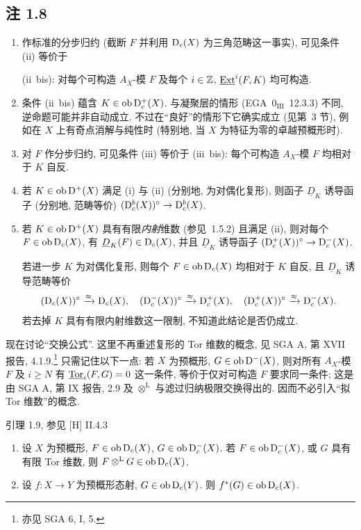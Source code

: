 \subsection*{注 1.8}
\begin{enumerate}[label=\alph*)]
\item 作标准的分步归约 (截断 $F$ 并利用 $\mathrm{D}_c(X)$ 为三角范畴这一事实), 可见条件 (ii) 等价于

(ii~bis): 对每个可构造 $A_X$-模 $F$ 及每个 $i \in \mathbb Z$, $\underline{\operatorname{Ext}}^i(F,K)$ 均可构造.

\item 条件 (ii~bis) 蕴含 $K \in \operatorname{ob} \mathrm{D}_c^{+}(X)$. 与凝聚层的情形 (EGA~$0_{\mathrm{III}}$~12.3.3) 不同, 逆命题可能并非自动成立. 不过在“良好”的情形下它确实成立 (见第~3 节), 例如在 $X$ 上有奇点消解与纯性时 (特别地, 当 $X$ 为特征为零的卓越预概形时).

\item 对 $F$ 作分步归约, 可见条件 (iii) 等价于 (iii~bis): 每个可构造 $A_X$-模 $F$ 均相对于 $K$ 自反.

\item 若 $K \in \operatorname{ob} \mathrm{D}^{+}(X)$ 满足 (i) 与 (ii) (分别地, 为对偶化复形), 则函子 $\underline{D}_K$ 诱导函子 (分别地, 范畴等价) $(\mathrm{D}_c^{b}(X))^{\circ} \to \mathrm{D}_c^{b}(X)$.

\item 若 $K \in \operatorname{ob} \mathrm{D}^{+}(X)$ 具有有限\emph{内射}维数 (参见~1.5.2) 且满足 (ii), 则对每个 $F \in \operatorname{ob} \mathrm{D}_c(X)$, 有 $\underline{D}_K(F) \in \mathrm{D}_c(X)$, 并且 $\underline{D}_K$ 诱导函子 $(\mathrm{D}_c^{+}(X))^{\circ} \to \mathrm{D}_c^{-}(X)$.

若进一步 $K$ 为对偶化复形, 则每个 $F \in \operatorname{ob} \mathrm{D}_c(X)$ 均相对于 $K$ 自反, 且 $\underline{D}_K$ 诱导范畴等价
\[
(\mathrm{D}_c(X))^{\circ} \xrightarrow{\approx} \mathrm{D}_c(X), \quad (\mathrm{D}_c^{-}(X))^{\circ} \xrightarrow{\approx} \mathrm{D}_c^{+}(X), \quad (\mathrm{D}_c^{+}(X))^{\circ} \xrightarrow{\approx} \mathrm{D}_c^{-}(X).
\]
若去掉 $K$ 具有有限内射维数这一限制, 不知道此结论是否仍成立.
\end{enumerate}

现在讨论“交换公式”. 这里不再重述复形的 Tor 维数的概念, 见 SGA A, 第 XVII 报告, 4.1.9.\footnote{亦见 SGA 6, I, 5.} 只需记住以下一点: 若 $X$ 为预概形, $G\in\operatorname{ob}\mathrm{D}^-(X)$, 则对所有 $A_X$-模 $F$ 及 $i\geqslant N$ 有 $\underline{\operatorname{Tor}}_i(F,G)=0$ 这一条件, 等价于仅对可构造 $F$ 要求同一条件; 这是由 SGA A, 第 IX 报告, 2.9 及 $\otimes^{\mathrm L}$ 与滤过归纳极限交换得出的. 因而不必引入“拟 Tor 维数”的概念.

\begin{statement}{引理 1.9, 参见 [H] II.4.3}
\begin{enumerate}[label=\alph*)]
\item 设 $X$ 为预概形, $F\in\operatorname{ob}\mathrm{D}_c(X)$, $G\in\operatorname{ob}\mathrm{D}_c^-(X)$. 若 $F\in\operatorname{ob}\mathrm{D}_c^-(X)$, 或 $G$ 具有有限 Tor 维数, 则 $F\otimes^{\mathrm L}G\in\operatorname{ob}\mathrm{D}_c(X)$.
\item 设 $f:X\to Y$ 为预概形态射, $G\in\operatorname{ob}\mathrm{D}_c(Y)$. 则 $f^*(G)\in\operatorname{ob}\mathrm{D}_c(X)$.
\end{enumerate}
\end{statement}

